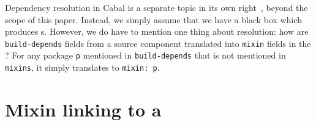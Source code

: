 Dependency resolution in Cabal is a separate topic in its own
right~\cite{well-typed-solver, well-typed-qualified}, beyond the scope of this paper.
Instead, we simply assume that we have a black box which
produces \ccomp{}s.  However, we do have to mention one thing about resolution:
how are \verb|build-depends| fields from
a source component translated into \verb|mixin| fields in the
\ccomp{}?  For any package \verb|p| mentioned in \verb|build-depends|
that is not mentioned in \verb|mixins|, it simply translates to
\verb|mixin: p|.

\section{Mixin linking to a \unit{}}
\label{sec:overview-mixin}

\begin{figure}


\end{figure}

